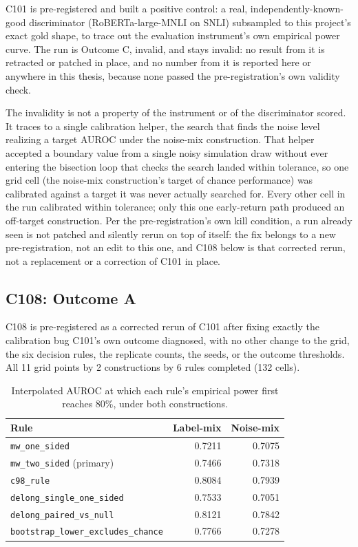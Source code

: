 C101 is pre-registered and built a positive control: a real, independently-known-good discriminator
(RoBERTa-large-MNLI on SNLI) subsampled to this project's exact gold shape,
to trace out the evaluation instrument's own empirical power curve. The run
is Outcome C, invalid, and stays invalid: no result from it is retracted or
patched in place, and no number from it is reported here or anywhere in this
thesis, because none passed the pre-registration's own validity check.

The invalidity is not a property of the instrument or of the discriminator
scored. It traces to a single calibration helper, the search that finds the
noise level realizing a target AUROC under the noise-mix construction. That
helper accepted a boundary value from a single noisy simulation draw without
ever entering the bisection loop that checks the search landed within
tolerance, so one grid cell (the noise-mix construction's target of chance
performance) was calibrated against a target it was never actually searched
for. Every other cell in the run calibrated within tolerance; only this one
early-return path produced an off-target construction. Per the
pre-registration's own kill condition, a run already seen is not patched and
silently rerun on top of itself: the fix belongs to a new pre-registration,
not an edit to this one, and C108 below is that corrected rerun, not a
replacement or a correction of C101 in place.

\subsection{C108: Outcome A}
\label{sup:sec:s5-c108}

C108 is pre-registered as a corrected rerun of C101 after fixing exactly the calibration bug C101's
own outcome diagnosed, with no other change to the grid, the six decision
rules, the replicate counts, the seeds, or the outcome thresholds. All 11
grid points by 2 constructions by 6 rules completed (132 cells).

\begin{table}[H]
\caption[C108 crossings at 80\% power]{Interpolated AUROC at which each rule's
empirical power first reaches 80\%, under both constructions.}
\centering
\begin{tabular}{lrr}
\toprule
\textbf{Rule} & \textbf{Label-mix} & \textbf{Noise-mix} \\
\midrule
\texttt{mw\_one\_sided}                & 0.7211 & 0.7075 \\
\texttt{mw\_two\_sided} (primary)      & 0.7466 & 0.7318 \\
\texttt{c98\_rule}                     & 0.8084 & 0.7939 \\
\texttt{delong\_single\_one\_sided}    & 0.7533 & 0.7051 \\
\texttt{delong\_paired\_vs\_null}      & 0.8121 & 0.7842 \\
\texttt{bootstrap\_lower\_excludes\_chance} & 0.7766 & 0.7278 \\
\bottomrule
\end{tabular}
\label{sup:tab:s5-c108-crossings}
\end{table}

